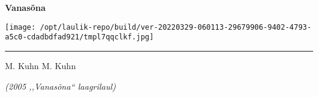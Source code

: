 \documentclass[12pt]{extbook}
\begin{document}
{
  \samepage
  \raggedbottom
  \raggedright
  \sloppy


  \vspace{0.2in}
    \noindent\begin{minipage}{.1\textwidth}
      \hfill\vspace{0.1in}
    \end{minipage}%
    \noindent\begin{minipage}{.8\textwidth}
      \centering
      \bfseries
      \large Vanasõna
    \end{minipage}%
    \noindent\begin{minipage}{.1\textwidth}
      \texttt{[image: /opt/laulik-repo/build/ver-20220329-060113-29679906-9402-4793-a5c0-cdadbdfad921/tmpl7qqclkf.jpg]}
    \end{minipage}
  \nopagebreak[4]
  \vspace{0.1in}
  \nopagebreak[4]
  \hrule height 0.05ex
  \nopagebreak[4]
  \vspace{-0.05in}

  {\footnotesize M. Kuhn \hfill M. Kuhn }\\
  \vspace{0.01in}

  {\em {\footnotesize (2005 ,,Vanas\~ona{``} laagrilaul) } }
  \vspace{0.01in}

    \vspace{-0.05in}
  \nopagebreak[4]
  {%
\parindent 0pt
\noindent
\ifx\preLilyPondExample \undefined
\else
  \expandafter\preLilyPondExample
\fi
\def\lilypondbook{}%

\ifx\postLilyPondExample \undefined
\else
  \expandafter\postLilyPondExample
\fi
}
  \vspace{-0.1in}

}
\end{document}
